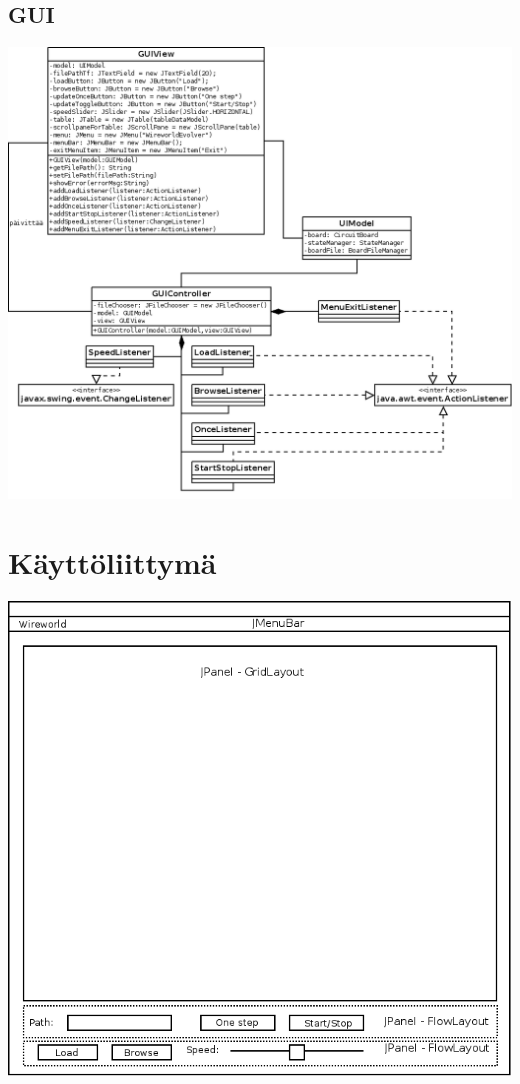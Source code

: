 \documentclass[a4paper,12pt]{article}
\begin{document}
\subsection{GUI}
\includegraphics[width=6in]{luokkakaavioGUI.png}
\section{Käyttöliittymä}
\includegraphics[width=6in]{kayttoliittyma1.png}
\end{document}
